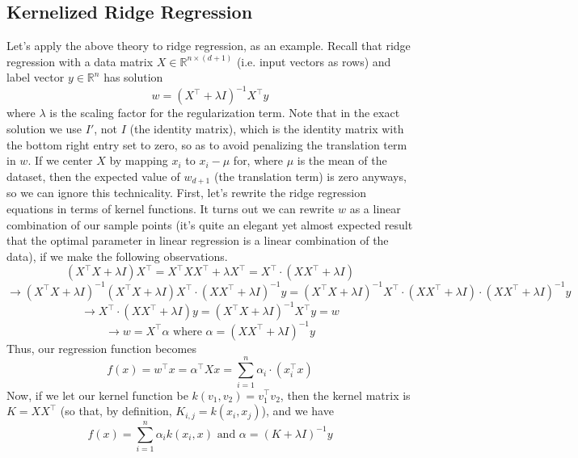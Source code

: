 \documentclass{article}
\begin{document}
\subsection{Kernelized Ridge Regression}
Let's apply the above theory to ridge regression, as an example. Recall that ridge regression with a data matrix $ X \in \mathbb{R}^{n \times (d + 1)} $ (i.e. input vectors as rows) and label vector $ y \in \mathbb{R}^n $ has solution
$$ w = (X^\intercal + \lambda I)^{-1} X^{\intercal} y $$
where $ \lambda $ is the scaling factor for the regularization term. Note that in the exact solution we use $ I' $, not $ I $ (the identity matrix), which is the identity matrix with the bottom right entry set to zero, so as to avoid penalizing the translation term in $ w $. If we center $ X $ by mapping $ x_i $ to $ x_i - \mu $ for, where $ \mu $ is the mean of the dataset, then the expected value of $ w_{d + 1} $ (the translation term) is zero anyways, so we can ignore this technicality.
\newline
First, let's rewrite the ridge regression equations in terms of kernel functions. It turns out we can rewrite $ w $ as a linear combination of our sample points (it's quite an elegant yet almost expected result that the optimal parameter in linear regression is a linear combination of the data), if we make the following observations.
$$ (X^\intercal X + \lambda I) X^\intercal = X^\intercal X X^\intercal + \lambda X^\intercal = X^\intercal \cdot (X X^\intercal + \lambda I) $$
$$ \rightarrow (X^\intercal X + \lambda I)^{-1} (X^\intercal X + \lambda I) X^\intercal \cdot (X X^\intercal + \lambda I)^{-1} y = (X^\intercal X + \lambda I)^{-1} X^\intercal \cdot (X X^\intercal + \lambda I) \cdot (X X^\intercal + \lambda I)^{-1} y $$
$$ \rightarrow X^\intercal \cdot (X X^\intercal + \lambda I) y = (X^\intercal X + \lambda I)^{-1} X^\intercal y = w $$
$$ \rightarrow w = X^\intercal \alpha \text{ where } \alpha = (X X^\intercal + \lambda I)^{-1} y $$
Thus, our regression function becomes
$$ f(x) = w^\intercal x = \alpha^\intercal X x = \sum_{i = 1}^n \alpha_i \cdot (x^\intercal_i x) $$
Now, if we let our kernel function be $ k(v_1, v_2) = v_1^\intercal v_2 $, then the kernel matrix is $ K = X X^\intercal $ (so that, by definition, $ K_{i, j} = k(x_i, x_j) $), and we have
$$ f(x) = \sum_{i = 1}^n \alpha_i k(x_i, x) \text{ and } \alpha = (K + \lambda I)^{-1} y $$
\newline
\end{document}
